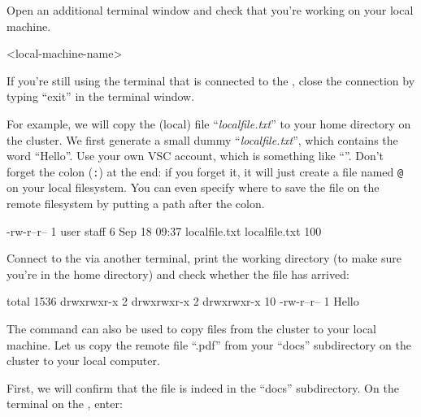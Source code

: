   Open an additional terminal window and check that you're working on your local
  machine.

\begin{prompt}
<local-machine-name>
\end{prompt}

  If you're still using the terminal that is connected to the \hpc, close the
  connection by typing ``exit'' in the terminal window.

  For example, we will copy the (local) file ``\emph{localfile.txt}'' to your
  home directory on the \hpc cluster. We first generate a small dummy
  ``\emph{localfile.txt}'', which contains the word ``Hello''.  Use your own
  VSC account, which is something like ``\emph{\userid}''. Don't
  forget the colon (\lstinline|:|) at the end: if you forget it, it will just create a file
  named \texttt{\userid{}@\loginnode{}} on your local filesystem. You can even
  specify where to save the file on the remote filesystem by putting a path after the colon.

\begin{prompt}
-rw-r--r-- 1 user  staff   6 Sep 18 09:37 localfile.txt
localfile.txt    100%
\end{prompt}

  Connect to the \hpc via another terminal, print the working directory (to make
  sure you're in the home directory) and check whether the file has arrived:

\begin{prompt}
total 1536
drwxrwxr-x  2 %
drwxrwxr-x  2 %
drwxrwxr-x 10 %
-rw-r--r--  1 %
Hello
\end{prompt}

  The  command can also be used to copy files from the cluster to your local machine.
  Let us copy the remote file ``\jobname.pdf'' from your ``docs''
  subdirectory on the cluster to your local computer.

  First, we will confirm that the file is indeed in the ``docs'' subdirectory.
  On the terminal on the \hpc, enter:


